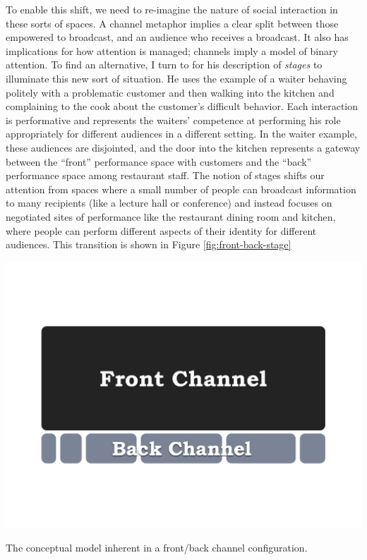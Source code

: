 To enable this shift, we need to re-imagine the nature of social interaction in these sorts of spaces. A channel metaphor implies a clear split between those empowered to broadcast, and an audience who receives a broadcast. It also has implications for how attention is managed; channels imply a model of binary attention. To find an alternative, I turn to \citet{goffman_presentation_1959} for his description of \emph{stages} to illuminate this new sort of situation. He uses the example of a waiter behaving politely with a problematic customer and then walking into the kitchen and complaining to the cook about the customer's difficult behavior. Each interaction is performative and represents the waiters' competence at performing his role appropriately for different audiences in a different setting. In the waiter example, these audiences are disjointed, and the door into the kitchen represents a gateway between the ``front'' performance space with customers and the ``back'' performance space among restaurant staff. The notion of stages shifts our attention from spaces where a small number of people can broadcast information to many recipients (like a lecture hall or conference) and instead focuses on negotiated sites of performance like the restaurant dining room and kitchen, where people can perform different aspects of their identity for different audiences. This transition is shown in Figure \ref{fig:front-back-stage}


\begin{marginfigure}
	\includegraphics{figures/front-back-channel.png}
	\caption{The conceptual model inherent in a front/back channel configuration.}
	\label{fig:front-back-channel}
\end{marginfigure}



